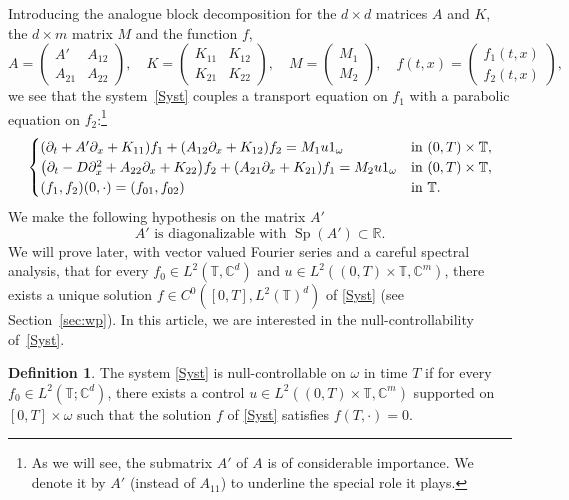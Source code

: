 \documentclass[10pt]{amsart}
\theoremstyle{plain}
\theoremstyle{definition}
\newtheorem{definition}[theorem]{Definition}
\theoremstyle{remark}
\DeclareMathOperator{\Sp}{Sp}
\newcommand{\set}{\mathbb}
\renewcommand{\C}{\set{C}}
\newcommand{\T}{\set{T}}
\let\originalleft\left
\let\originalright\right
\renewcommand{\left}{\mathopen{}\mathclose\bgroup\originalleft}
\renewcommand{\right}{\aftergroup\egroup\originalright}
\begin{document}
Introducing the analogue block decomposition for the $d\times d$ matrices $A$ and $K$, the $d \times m$ matrix $M$ and the function $f$,
\[
A = \begin{pmatrix}A'& A_{12}\\A_{21}&A_{22}\end{pmatrix}, \quad
K = \begin{pmatrix}K_{11}& K_{12}\\ K_{21}& K_{22}\end{pmatrix}, \quad
M= \begin{pmatrix}M_1 \\ M_2\end{pmatrix}, \quad
f(t,x)=\begin{pmatrix} f_1(t,x) \\ f_2(t,x) \end{pmatrix},
\]
we see that the system~\eqref{Syst} couples a transport equation on $f_1$ with a parabolic equation on $f_2$:\footnote{As we will see, the submatrix $A'$ of $A$ is of considerable importance. We denote it by $A'$ (instead of $A_{11}$) to underline the special role it plays.}
\begin{equation}
\label{Syst_bloc}
\begin{cases}
\left(\partial_t +A'\partial_x+K_{11}\right)f_1+\left(A_{12}\partial_x+K_{12}\right)f_2= M_1 u 1_\omega
&\text{in}\ (0,T)\times \T,\!\\
\left(\partial_t -D\partial_x^2+A_{22}\partial_x+K_{22}\right)f_2 +\left(A_{21}\partial_x+K_{21}\right)f_1 = M_2 u 1_\omega &\text{in}\ (0,T)\times \T,\!\\
(f_1,f_2)(0,\cdot)=(f_{01},f_{02}) & \text{in}\ \T.
\end{cases}
\end{equation}
We make the following hypothesis on the matrix $A'$
\begin{equation}
\tag{H.4}
A'\text{ is diagonalizable with }\Sp(A')\subset \set R.\label{h:A1}
\end{equation}
We will prove later, with vector valued Fourier series and a careful spectral analysis, that for every $f_0 \in L^2(\T,\C^d)$ and $u\in L^2((0,T)\times\T,\C^m)$, there exists a unique solution $f\in C^0([0,T],L^2(\T)^d)$ of \eqref{Syst} (see Section~\ref{sec:wp}).
In this article, we are interested in the null-controllability of~\eqref{Syst}.
\begin{definition} \label{definition:NC}
The system \eqref{Syst} is null-controllable on $\omega$ in time $T$ if for every $f_0 \in L^2(\T;\C^d)$, there exists a control $u \in L^2((0,T)\times\T,\C^m)$ supported on $[0,T]\times\omega$ such that the solution $f$ of \eqref{Syst} satisfies $f(T,\cdot)=0$.
\end{definition}
\end{document}
